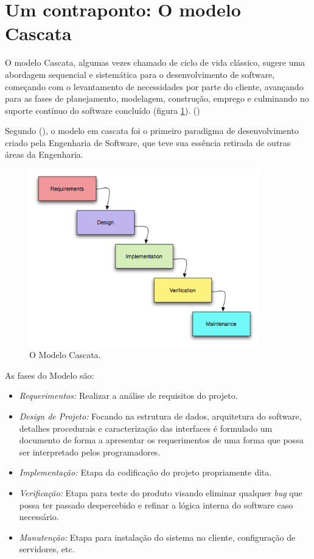 \section{Um contraponto: O modelo Cascata}
    \par O modelo Cascata, algumas vezes chamado de ciclo de vida clássico, sugere uma abordagem sequencial e sistemática para o desenvolvimento de software, começando com o levantamento de necessidades por parte do cliente, avançando para as fases de planejamento, modelagem, construção, emprego e culminando no suporte contínuo do software concluído (figura \ref{fig:waterfall}). (\cite{pressman:11})
    \par Segundo  (\cite{pressman:11}), o modelo em cascata foi o primeiro paradigma de desenvolvimento criado pela Engenharia de Software, que teve sua essência retirada de outras áreas da Engenharia.
\begin{figure}[htb]
\centering
\includegraphics[width=10cm]{figuras/waterfall}
\caption{\label{fig:waterfall}O Modelo Cascata.}
\end{figure}
	\par As fases do Modelo são:
\begin{itemize}
\item \emph{ Requerimentos:} Realizar a análise de requisitos do projeto.
\item \emph{ Design de Projeto:}  Focando na estrutura de dados, arquitetura do software, detalhes procedurais e caracterização das interfaces é formulado um documento de forma a apresentar os requerimentos de uma forma que possa ser interpretado pelos programadores.
\item \emph{ Implementação:} Etapa da codificação do projeto propriamente dita.
\item \emph{  Verificação: } Etapa para teste do produto visando eliminar qualquer \emph{bug} que possa ter passado despercebido e refinar a lógica interna do software caso necessário.
\item \emph{ Manutenção: } Etapa para instalação do sistema no cliente, configuração de servidores, etc.
\end{itemize}

